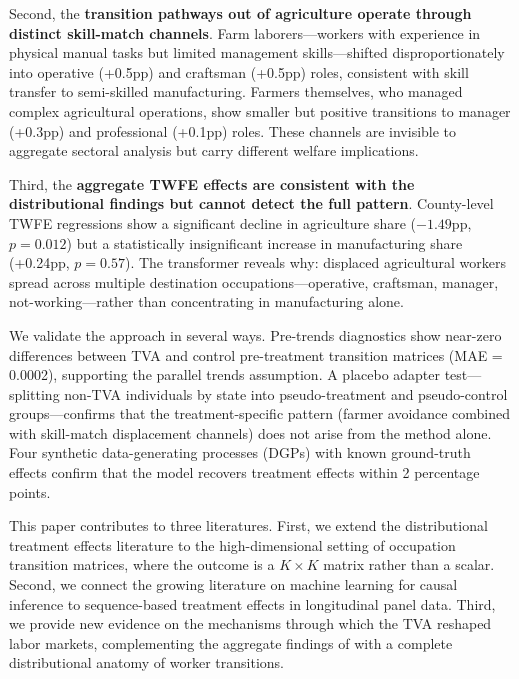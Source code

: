 \documentclass[12pt]{article}
\begin{document}
Second, the \textbf{transition pathways out of agriculture operate through distinct skill-match channels}. Farm laborers---workers with experience in physical manual tasks but limited management skills---shifted disproportionately into operative (+0.5pp) and craftsman (+0.5pp) roles, consistent with skill transfer to semi-skilled manufacturing. Farmers themselves, who managed complex agricultural operations, show smaller but positive transitions to manager (+0.3pp) and professional (+0.1pp) roles. These channels are invisible to aggregate sectoral analysis but carry different welfare implications.

Third, the \textbf{aggregate TWFE effects are consistent with the distributional findings but cannot detect the full pattern}. County-level TWFE regressions show a significant decline in agriculture share ($-1.49$pp, $p = 0.012$) but a statistically insignificant increase in manufacturing share (+0.24pp, $p = 0.57$). The transformer reveals why: displaced agricultural workers spread across multiple destination occupations---operative, craftsman, manager, not-working---rather than concentrating in manufacturing alone.

We validate the approach in several ways. Pre-trends diagnostics show near-zero differences between TVA and control pre-treatment transition matrices (MAE = 0.0002), supporting the parallel trends assumption. A placebo adapter test---splitting non-TVA individuals by state into pseudo-treatment and pseudo-control groups---confirms that the treatment-specific pattern (farmer avoidance combined with skill-match displacement channels) does not arise from the method alone. Four synthetic data-generating processes (DGPs) with known ground-truth effects confirm that the model recovers treatment effects within 2 percentage points.

This paper contributes to three literatures. First, we extend the distributional treatment effects literature \citep{athey2006, callaway2019} to the high-dimensional setting of occupation transition matrices, where the outcome is a $K \times K$ matrix rather than a scalar. Second, we connect the growing literature on machine learning for causal inference \citep{athey2019} to sequence-based treatment effects in longitudinal panel data. Third, we provide new evidence on the mechanisms through which the TVA reshaped labor markets, complementing the aggregate findings of \citet{kline2014} with a complete distributional anatomy of worker transitions.
\end{document}
